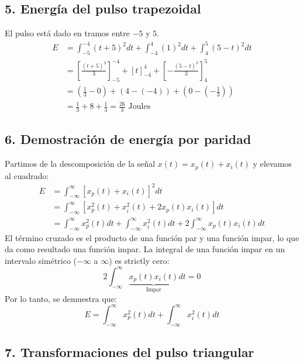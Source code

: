 \documentclass[12pt]{article}
\begin{document}
\subsection*{5. Energía del pulso trapezoidal}
El pulso está dado en tramos entre $-5$ y $5$.
\begin{align*}
    E &= \int_{-5}^{-4} (t+5)^2 dt + \int_{-4}^{4} (1)^2 dt + \int_{4}^{5} (5-t)^2 dt \\
      &= \left[ \frac{(t+5)^3}{3} \right]_{-5}^{-4} + \left[ t \right]_{-4}^{4} + \left[ -\frac{(5-t)^3}{3} \right]_{4}^{5} \\
      &= \left(\frac{1}{3} - 0\right) + (4 - (-4)) + \left(0 - \left(-\frac{1}{3}\right)\right) \\
      &= \frac{1}{3} + 8 + \frac{1}{3} = \frac{26}{3} \text{ Joules}
\end{align*}

\subsection*{6. Demostración de energía por paridad}
Partimos de la descomposición de la señal $x(t) = x_p(t) + x_i(t)$ y elevamos al cuadrado:
\begin{align*}
    E &= \int_{-\infty}^{\infty} [x_p(t) + x_i(t)]^2 dt \\
      &= \int_{-\infty}^{\infty} [x_p^2(t) + x_i^2(t) + 2x_p(t)x_i(t)] dt \\
      &= \int_{-\infty}^{\infty} x_p^2(t) dt + \int_{-\infty}^{\infty} x_i^2(t) dt + 2\int_{-\infty}^{\infty} x_p(t)x_i(t) dt
\end{align*}
El término cruzado es el producto de una función par y una función impar, lo que da como resultado una función impar. La integral de una función impar en un intervalo simétrico ($-\infty$ a $\infty$) es strictly cero:
\begin{equation*}
    2\int_{-\infty}^{\infty} \underbrace{x_p(t)x_i(t)}_{\text{Impar}} dt = 0
\end{equation*}
Por lo tanto, se demuestra que:
\begin{equation*}
    E = \int_{-\infty}^{\infty} x_p^2(t) dt + \int_{-\infty}^{\infty} x_i^2(t) dt
\end{equation*}

\newpage
\subsection*{7. Transformaciones del pulso triangular}
\end{document}
